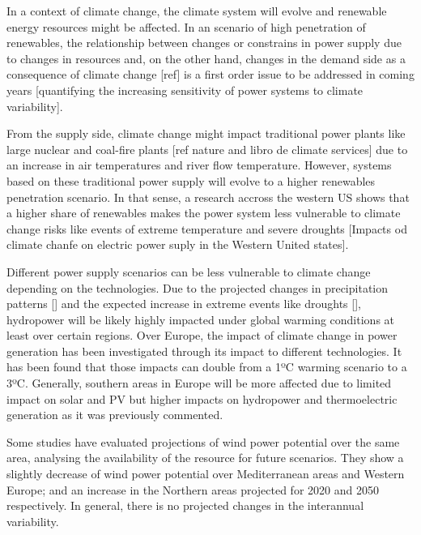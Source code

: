 In a context of climate change, the climate system will evolve and renewable energy resources might be affected. In an scenario of high penetration of renewables, the relationship between changes or constrains in power supply due to changes in resources and, on the other hand, changes in the demand side as a consequence of climate change [ref] is a first order issue to be addressed in coming years [quantifying the increasing  sensitivity of power systems to climate variability].

From the supply side, climate change might impact traditional power plants like large nuclear and coal-fire plants [ref nature and libro de climate services] due to an increase in air temperatures and river flow temperature. However, systems based on these traditional power supply will evolve to a higher renewables penetration scenario. In that sense, a research accross the western US shows that a higher share of renewables makes the power system less vulnerable to climate change risks like events of extreme temperature and severe droughts [Impacts od climate chanfe on electric power suply in the Western United states].  

Different power supply scenarios can be less vulnerable to climate change depending on the technologies. Due to the projected changes in precipitation patterns [] and the expected increase in extreme events like droughts [], hydropower will be likely highly impacted under global warming conditions at least over certain regions. Over Europe, the impact of climate change in power generation has been investigated through its impact to different technologies. It has been found that those impacts can double from a 1ºC warming scenario to a 3ºC. Generally, southern areas in Europe will be more affected due to limited impact on solar and PV but higher impacts on hydropower and thermoelectric generation \cite*{Tobin2018} as it was previously commented.

Some studies have evaluated projections of wind power potential over the same area, analysing the availability of the resource for future scenarios. They show a slightly decrease of wind power potential over Mediterranean areas and Western Europe; and an increase in the Northern areas \cite*{Tobin2015, Tobin2016} projected for 2020 and 2050 respectively. In general, there is no projected changes in the interannual variability.

